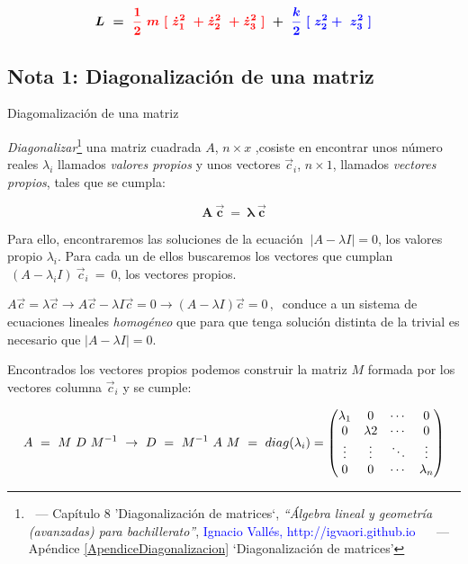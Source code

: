 	$$\boldsymbol{
		L\ =\ \textcolor{red}{\dfrac 1 2 \ m \ [ \ \dot z_1^2 \ + \dot z_2^2 \ + \dot z_3^2 \ ]} \ + \ \textcolor{blue}{\dfrac k 2 \ [\ z_2^2  + \ z_3^2 \ ]}
	}$$	


\vspace{1cm}

\begin{ejemplo}
	\subsection{Nota 1: Diagonalización de una matriz}
\end{ejemplo}
	
	\begin{myexampleblock}{Diagomalización de una matriz}
		
		\vspace{2mm} \emph{Diagonalizar}\footnote{$\ $ --- Capítulo 8 'Diagonalización de matrices`,  \emph{``Álgebra lineal y geometría (avanzadas) para bachillerato''}, \textcolor{blue}{Ignacio Vallés, http://igvaori.github.io} $\quad$  --- Apéndice \ref{ApendiceDiagonalizacion} `Diagonalización de matrices'} una matriz cuadrada $A$, $n\times x$ ,cosiste en encontrar unos número reales $\lambda_i$ llamados \emph{valores propios} y unos vectores $\vec c_i$, $n\times 1$, llamados \emph{vectores propios}, tales que se cumpla:
		
		$$\boldsymbol{ A \ \vec c \ = \ \lambda \ \vec c }$$
		
	Para ello, encontraremos las soluciones de la ecuación $\ |A-\lambda I|=0$, los valores propio $\lambda_i$. Para cada un de ellos buscaremos los vectores que cumplan $\ (A-\lambda_i I)\  \vec c_i \ = \ 0$, los vectores propios.
		
	\vspace{2mm} \textcolor{gris} {$A\vec c=\lambda \vec c \to A\vec c - \lambda I \vec c=0 \to (A-\lambda I)\vec c=0\, ,\ $ conduce a un sistema de ecuaciones lineales \emph{homogéneo} que para que tenga solución distinta de la trivial es necesario que $|A-\lambda I|=0$. }
		
	\vspace{2mm} Encontrados los vectores propios podemos construir la matriz $M$ formada por los vectores columna $\vec c_i$ y se cumple:
		
		$$A \ = \ M \ D \ M^{-1} \ \to \ D \ = \ M^{-1} \ A \ M \ = \ diag(\lambda_i)=\mqty(\lambda_1 & 0 & \cdots &0\\
		0&\lambda2&\cdots &0\\ \vdots&\vdots&\ddots&\vdots\\0&0&\cdots&\lambda_n)$$
		

\end{myexampleblock}
